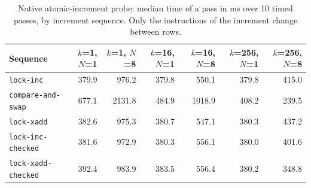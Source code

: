\begin{table}[htbp]
\caption{Native atomic-increment probe: median time of a pass in ms over 10 timed passes, by increment sequence. Only the instructions of the increment change between rows.}\label{tab:probe}
\centering\small
\begin{tabular}{lrrrrrr}
\toprule
Sequence & $k$=1, $N$=1 & $k$=1, $N$=8 & $k$=16, $N$=1 & $k$=16, $N$=8 & $k$=256, $N$=1 & $k$=256, $N$=8 \\
\midrule
\texttt{lock-inc} & 379.9 & 976.2 & 379.8 & 550.1 & 379.8 & 415.0 \\
\texttt{compare-and-swap} & 677.1 & 2131.8 & 484.9 & 1018.9 & 408.2 & 239.5 \\
\texttt{lock-xadd} & 382.6 & 975.3 & 380.7 & 547.1 & 380.3 & 437.2 \\
\texttt{lock-inc-checked} & 381.6 & 972.9 & 380.3 & 556.1 & 380.0 & 401.6 \\
\texttt{lock-xadd-checked} & 392.4 & 983.9 & 383.5 & 556.4 & 380.2 & 348.8 \\
\bottomrule
\end{tabular}
\end{table}
